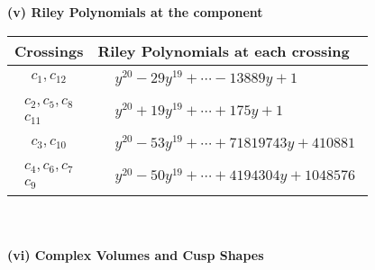\documentclass[1p]{elsarticle_modified}
\theoremstyle{definition}
\begin{document}
\newpage\renewcommand{\arraystretch}{1}
\flushleft \textbf{(v) Riley Polynomials at the component}\newline \\
\begin{tabular}{m{50pt}|m{274pt}}
Crossings & \hspace{64pt}Riley Polynomials at each crossing \\
\hline $$\begin{aligned}c_{1},c_{12}\end{aligned}$$&$\begin{aligned}
&y^{20}-29 y^{19}+\cdots-13889 y+1
\end{aligned}$\\
\hline $$\begin{aligned}c_{2},c_{5},c_{8}\\c_{11}\end{aligned}$$&$\begin{aligned}
&y^{20}+19 y^{19}+\cdots+175 y+1
\end{aligned}$\\
\hline $$\begin{aligned}c_{3},c_{10}\end{aligned}$$&$\begin{aligned}
&y^{20}-53 y^{19}+\cdots+71819743 y+410881
\end{aligned}$\\
\hline $$\begin{aligned}c_{4},c_{6},c_{7}\\c_{9}\end{aligned}$$&$\begin{aligned}
&y^{20}-50 y^{19}+\cdots+4194304 y+1048576
\end{aligned}$\\
\hline
\end{tabular}\\~\\
\newpage\flushleft \textbf{(vi) Complex Volumes and Cusp Shapes}
\end{document}
